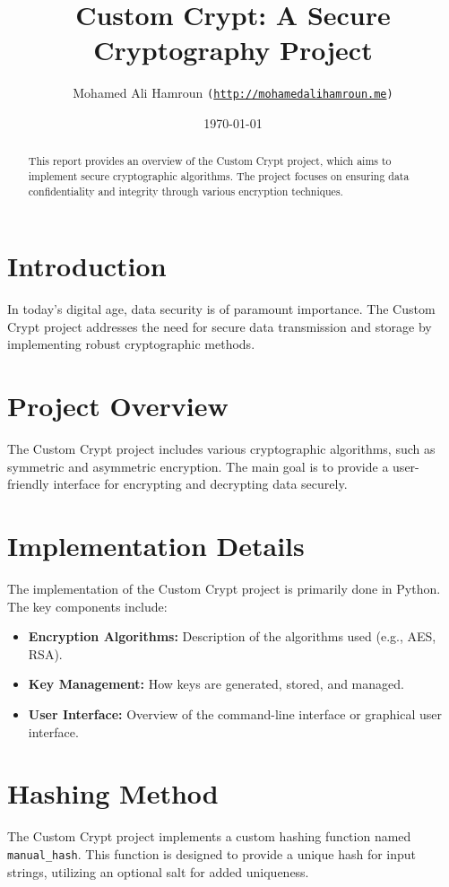 \documentclass[a4paper, 12pt]{article}
\title{Custom Crypt: A Secure Cryptography Project}
\author{Mohamed Ali Hamroun \texttt{(\url{http://mohamedalihamroun.me})}}
\date{\today}
\begin{document}
\maketitle

\begin{abstract}
This report provides an overview of the Custom Crypt project, which aims to implement secure cryptographic algorithms. The project focuses on ensuring data confidentiality and integrity through various encryption techniques.
\end{abstract}

\section{Introduction}
In today's digital age, data security is of paramount importance. The Custom Crypt project addresses the need for secure data transmission and storage by implementing robust cryptographic methods.

\section{Project Overview}
The Custom Crypt project includes various cryptographic algorithms, such as symmetric and asymmetric encryption. The main goal is to provide a user-friendly interface for encrypting and decrypting data securely.

\section{Implementation Details}
The implementation of the Custom Crypt project is primarily done in Python. The key components include:
\begin{itemize}
    \item \textbf{Encryption Algorithms:} Description of the algorithms used (e.g., AES, RSA).
    \item \textbf{Key Management:} How keys are generated, stored, and managed.
    \item \textbf{User Interface:} Overview of the command-line interface or graphical user interface.
\end{itemize}

\section{Hashing Method}
The Custom Crypt project implements a custom hashing function named \texttt{manual\_hash}. This function is designed to provide a unique hash for input strings, utilizing an optional salt for added uniqueness.
\end{document}
